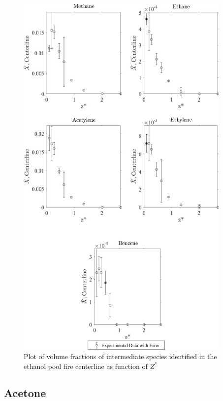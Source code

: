 \documentclass[12pt]{article}
\begin{document}
\begin{figure}[!h]
	\centering
\includegraphics[width=10.5cm,keepaspectratio]{Ethanol_Inter_MOL_FRAC_Plot.png}
	\caption[Plot of volume fractions, with error, of intermediate species identified in the ethanol pool fire centerline as function of $Z^{*}$]{Plot of volume fractions of intermediate species identified in the ethanol pool fire centerline as function of $Z^{*}$}
	\label{fig:Methanol_VOL_Frac_Inter}
\end{figure}


\pagebreak
\subsection{Acetone}
\label{ssec:Acetonel_ALL_Vol_Frac}
\end{document}
